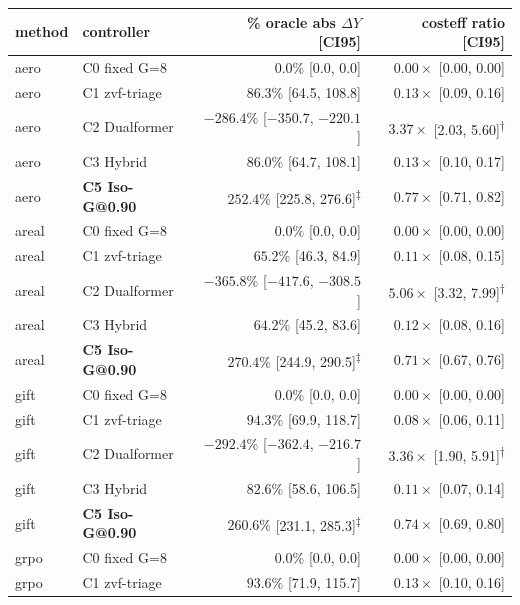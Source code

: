 \documentclass{article}
\begin{document}
\begin{table}[ht]
\centering
\small
\begin{tabular}{llrr}
\toprule
method & controller & \% oracle abs $\Delta Y$ [CI95] & costeff ratio [CI95] \\
\midrule
aero   & C0 fixed G=8       & $0.0\%$ [0.0, 0.0] & $0.00\times$ [0.00, 0.00] \\
aero   & C1 zvf-triage      & $86.3\%$ [64.5, 108.8] & $0.13\times$ [0.09, 0.16] \\
aero   & C2 Dualformer      & $-286.4\%$ [$-350.7$, $-220.1$] & $3.37\times$ [2.03, 5.60]\textsuperscript{$\dagger$} \\
aero   & C3 Hybrid          & $86.0\%$ [64.7, 108.1] & $0.13\times$ [0.10, 0.17] \\
aero   & \textbf{C5 Iso-G@0.90} & $\mathbf{252.4\%}$ [225.8, 276.6]\textsuperscript{$\ddagger$} & $\mathbf{0.77\times}$ [0.71, 0.82] \\
\midrule
areal  & C0 fixed G=8       & $0.0\%$ [0.0, 0.0] & $0.00\times$ [0.00, 0.00] \\
areal  & C1 zvf-triage      & $65.2\%$ [46.3, 84.9] & $0.11\times$ [0.08, 0.15] \\
areal  & C2 Dualformer      & $-365.8\%$ [$-417.6$, $-308.5$] & $5.06\times$ [3.32, 7.99]\textsuperscript{$\dagger$} \\
areal  & C3 Hybrid          & $64.2\%$ [45.2, 83.6] & $0.12\times$ [0.08, 0.16] \\
areal  & \textbf{C5 Iso-G@0.90} & $\mathbf{270.4\%}$ [244.9, 290.5]\textsuperscript{$\ddagger$} & $\mathbf{0.71\times}$ [0.67, 0.76] \\
\midrule
gift   & C0 fixed G=8       & $0.0\%$ [0.0, 0.0] & $0.00\times$ [0.00, 0.00] \\
gift   & C1 zvf-triage      & $94.3\%$ [69.9, 118.7] & $0.08\times$ [0.06, 0.11] \\
gift   & C2 Dualformer      & $-292.4\%$ [$-362.4$, $-216.7$] & $3.36\times$ [1.90, 5.91]\textsuperscript{$\dagger$} \\
gift   & C3 Hybrid          & $82.6\%$ [58.6, 106.5] & $0.11\times$ [0.07, 0.14] \\
gift   & \textbf{C5 Iso-G@0.90} & $\mathbf{260.6\%}$ [231.1, 285.3]\textsuperscript{$\ddagger$} & $\mathbf{0.74\times}$ [0.69, 0.80] \\
\midrule
grpo   & C0 fixed G=8       & $0.0\%$ [0.0, 0.0] & $0.00\times$ [0.00, 0.00] \\
grpo   & C1 zvf-triage      & $93.6\%$ [71.9, 115.7] & $0.13\times$ [0.10, 0.16] \\

\end{tabular}
\end{table}
\end{document}

